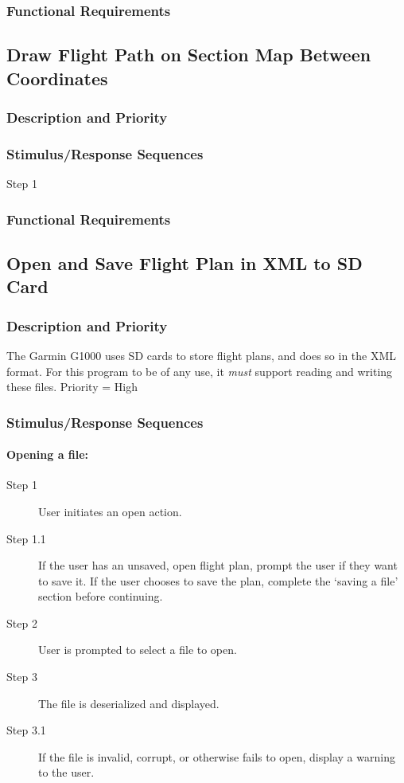 \documentclass[12pt, letterpaper]{article}
\begin{document}
      \subsubsection{Functional Requirements}

      \subsection{Draw Flight Path on Section Map Between Coordinates}
        \subsubsection{Description and Priority}
        \subsubsection{Stimulus/Response Sequences}
          \begin{description}
            \item[Step 1]
          \end{description}
        \subsubsection{Functional Requirements}

        \subsection{Open and Save Flight Plan in XML to SD Card}
          \subsubsection{Description and Priority}
            The Garmin G1000 uses SD cards to store flight plans, and does so in the XML format.
            For this program to be of any use, it \emph{must} support reading and writing these files.
            Priority = High
          \subsubsection{Stimulus/Response Sequences}
            \paragraph{Opening a file:}
            \begin{description}
              \item[Step 1] User initiates an open action.
              \item[Step 1.1] If the user has an unsaved, open flight plan, prompt the user if they want to save it.
                If the user chooses to save the plan, complete the `saving a file' section before continuing.
              \item[Step 2] User is prompted to select a file to open.
              \item[Step 3] The file is deserialized and displayed.
              \item[Step 3.1] If the file is invalid, corrupt, or otherwise fails to open, display a warning to the user.
            \end{description}
\end{document}
